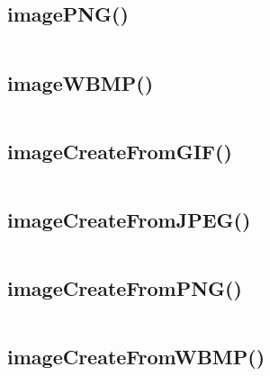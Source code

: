 \subsection{imagePNG()}


\begin{lstlisting}[language=PHP]

\end{lstlisting}

\subsection{imageWBMP()}


\begin{lstlisting}[language=PHP]

\end{lstlisting}




\subsection{imageCreateFromGIF()}





\begin{lstlisting}[language=PHP]

\end{lstlisting}


\subsection{imageCreateFromJPEG()}


\begin{lstlisting}[language=PHP]

\end{lstlisting}


\subsection{imageCreateFromPNG()}


\begin{lstlisting}[language=PHP]

\end{lstlisting}



\subsection{imageCreateFromWBMP()}




